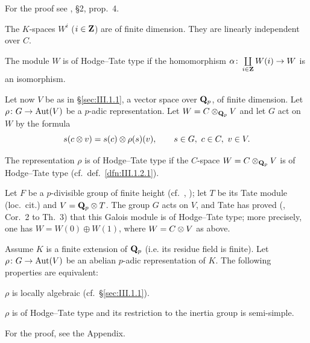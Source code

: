 For the proof see \cite{serre-galpdiv}, \S2, prop.~4.

\begin{corollary}
The $K$-spaces $W^i$ ($i \in \mathbf{Z}$) are of finite dimension.  They are
linearly independent over $C$.
\end{corollary}

\begin{dfn}[1]\label{dfn:III.1.2.1}
The module $W$ is of Hodge--Tate type if the homomorphism
$\alpha\colon \coprod\limits_{i \in \mathbf{Z}} W(i) \to W$ is an isomorphism.
\end{dfn}

Let now $V$ be as in \S\ref{sec:III.1.1}, a vector space over $\mathbf{Q}_p$,
of finite dimension.  Let $\rho\colon G \to \mathrm{Aut}(V)$ be a $p$-adic
representation.  Let $W = C \mathbin{\otimes}_{\mathbf{Q}_p} V$ and let $G$ act on $W$ by
the formula
\[
s(c \mathbin{\otimes} v) = s(c) \mathbin{\otimes} \rho(s)(v), \qquad s \in G,\ c \in C,\
v \in V.
\]

\begin{dfn}[2]
The representation $\rho$ is of Hodge--Tate type if the $C$-space
$W = C \mathbin{\otimes}_{\mathbf{Q}_p} V$ is of Hodge--Tate type
(cf.~def.~\ref{dfn:III.1.2.1}).
\end{dfn}


Let $F$ be a $p$-divisible group of finite height
(cf.~\cite{serre-pdiv}, \cite{tate-pdiv}); let $T$ be its Tate module
(loc.~cit.) and $V = \mathbf{Q}_p \mathbin{\otimes} T$.  The group $G$ acts on $V$, and
Tate has proved (\cite{tate-pdiv}, Cor.~2 to Th.~3) that this Galois
module is of Hodge--Tate type; more precisely, one has
$W = W(0) \oplus W(1)$, where $W = C \mathbin{\otimes} V$ as above.

\begin{theorem}
Assume $K$ is a finite extension of $\mathbf{Q}_p$ (i.e. its residue field is
finite).  Let $\rho\colon G \to \mathrm{Aut}(V)$ be an abelian $p$-adic
representation of $K$.  The following properties are equivalent:
\begin{alist}
\item $\rho$ is locally algebraic (cf.~\S\ref{sec:III.1.1}).

\item $\rho$ is of Hodge--Tate type and its restriction to the inertia
group is semi-simple.
\end{alist}
\end{theorem}

For the proof, see the Appendix.
